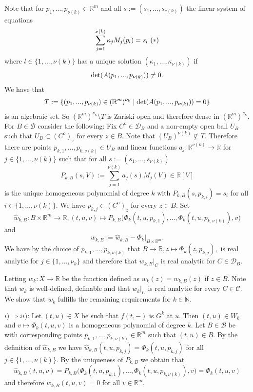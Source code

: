 \documentclass[12pt]{article}
\def\vs{\vspace}
\def\IR{\mathbb R}
\begin{document}
Note that for $p_1,...,p_{\nu(k)} \in \mathbb{R}^m$ and all $s:=(s_1,...,s_{\nu(k)})$ the linear system of equations 
$$\sum_{j=1}^{\nu(k)} \kappa_jM_j(p_l) = s_l \textnormal{ }(*)$$
where $l \in \{1,...,\nu(k)\}$ has a unique solution $(\kappa_1,...,\kappa_{\nu(k)})$ if 
$$\textnormal{det}(A(p_1,...,p_{\nu(k)})) \neq 0.$$
We have that
$$T:=\{(p_1,...,p_{\nu(k)}) \in (\mathbb{R}^m)^{\nu_k} \mid \textnormal{det}(A(p_1,...,p_{\nu(k)})) = 0\}$$
is an algebraic set. So $(\mathbb{R}^m)^{\nu_\kappa} \setminus T$ is Zariski open and therefore dense in $(\mathbb{R}^m)^{\nu_\kappa}$. For $B \in \mathcal{B}$ consider the following: Fix $C^o \in \mathcal{D}_B$ and a non-empty open ball $U_B$ such that $U_B \subset (C^o)_z$ for every $z \in B$. %
Note that $(U_B)^{\nu(k)} \not \subseteq T$. Therefore there are points $p_{k,1},\ldots,p_{k,\nu(k)} \in U_B$ and linear functions $a_j:\mathbb{R}^{\nu(k)} \to \mathbb{R}$ for $j \in \{1,...,\nu(k)\}$ such that for all $s:=(s_1,...,s_{\nu(k)})$
$$P_{k,B}(s,V):=\sum_{j=1}^{\nu(k)}a_j(s)M_j(V)\in \IR[V]$$
is the unique homogeneous polynomial of degree $k$ with
$P_{k,B}(s,p_{k,i})=s_i$ for all $i \in \{1,\ldots,\nu(k)\}$.
We have $p_{k,j} \in (C^o)_z$ for every $z \in B$. Set
$$\hat{w}_{k,B}:B \times\IR^m \to \mathbb{R}, (t,u,v) \mapsto P_{k,B}\big(\Phi_k(t,u,p_{k,1}),\ldots,\Phi_k(t,u,p_{k,\nu(k)}),v\big)$$
and
$$w_{k,B}:=\hat{w}_{k,B}-\Phi_k|_{B \times \mathbb{R}^m}.$$
We have by the choice of $p_{k,1},...,p_{k,\nu(k)}$ that $B \to \mathbb{R}, z \mapsto \Phi_k(z,p_{k,j}),$ is real analytic for $j \in \{1,...,\nu_k\}$ and therefore that $w_{k,B}|_C$ is real analytic for $C \in \mathcal{D}_B$. 

\vs{0.3cm}
Letting $w_k:X \to \mathbb{R}$ be the function defined as $w_k(z)=w_{k,B}(z)$ if $z \in B$. Note that $w_k$ is well-defined, definable and that $w_k|_C$ is real analytic for every $C \in \mathcal{C}$. We show that $w_k$ fulfills the remaining requirements for $k \in \mathbb{N}$.

\vs{0.3cm}
$i) \Rightarrow ii)$: Let $(t,u) \in X$ be such that $f(t,-)$ is $G^k$ at $u$. Then $(t,u) \in W_k$ and 
$v \mapsto \Phi_k(t,u,v)$ is a homogeneous polynomial of degree $k$. Let $B \in \mathcal{B}$ be with corresponding points $p_{k,1},...,p_{k,\nu(k)} \in \mathbb{R}^m$ such that $(t,u) \in B$. By the definition of $\hat{w}_{k,B}$ we have
$\hat{w}_{k,B}(t,u,p_{k,j})=\Phi_k(t,u,p_{k,j})$ for all $j \in \{1,\ldots,\nu(k)\}$.
By the uniqueness of $P_{k,B}$ we obtain that
$$\hat{w}_{k,B}(t,u,v)=P_{k,B}\big(\Phi_k(t,u,p_{k,1}),\ldots,\Phi_k(t,u,p_{k,\nu(k)}),v\big)=\Phi_k(t,u,v)$$
and therefore $w_{k,B}(t,u,v)=0$ for all $v\in \IR^m$. 
\end{document}
